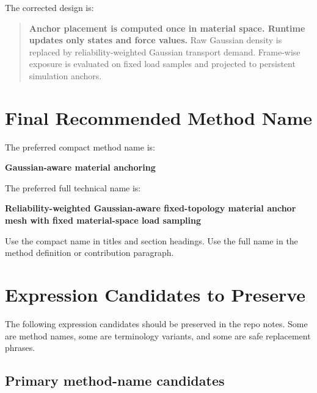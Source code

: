 \documentclass[11pt,a4paper]{article}
\begin{document}
The corrected design is:

\begin{quote}
\textbf{Anchor placement is computed once in material space. Runtime updates only states and force values.}\newline
Raw Gaussian density is replaced by reliability-weighted Gaussian transport demand. Frame-wise exposure is evaluated on fixed load samples and projected to persistent simulation anchors.
\end{quote}

\section{Final Recommended Method Name}

The preferred compact method name is:

\begin{center}
\Large\textbf{Gaussian-aware material anchoring}
\end{center}

The preferred full technical name is:

\begin{center}
\Large\textbf{Reliability-weighted Gaussian-aware fixed-topology material anchor mesh with fixed material-space load sampling}
\end{center}

Use the compact name in titles and section headings. Use the full name in the method definition or contribution paragraph.

\section{Expression Candidates to Preserve}

The following expression candidates should be preserved in the repo notes. Some are method names, some are terminology variants, and some are safe replacement phrases.

\subsection{Primary method-name candidates}
\end{document}
